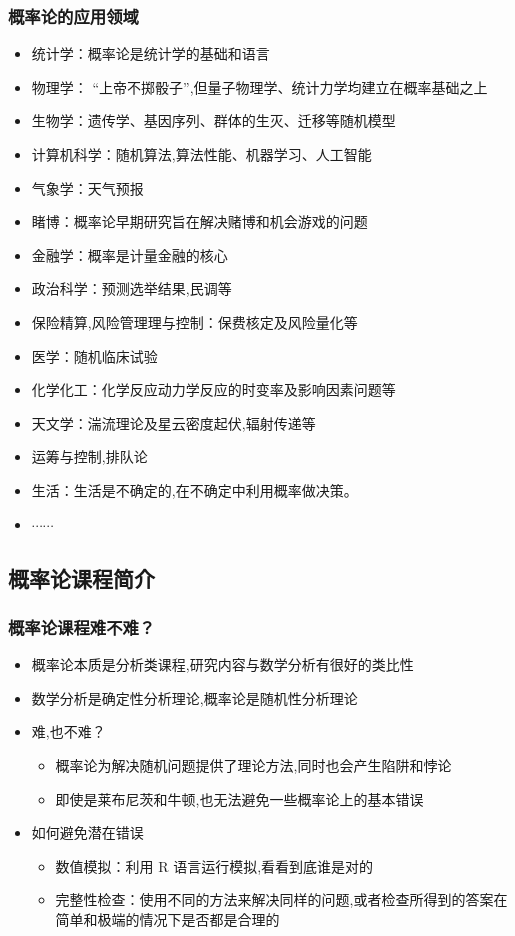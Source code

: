 \documentclass[Prob-All.tex]{subfiles}
\begin{document}
\begin{frame}
	\frametitle{概率论的应用领域}
	\begin{itemize}[<+-|alert@+>]
		\item 统计学：概率论是统计学的基础和语言
		\item 物理学： ``上帝不掷骰子”,但量子物理学、统计力学均建立在概率基础之上
		\item 生物学：遗传学、基因序列、群体的生灭、迁移等随机模型
		\item  计算机科学：随机算法,算法性能、机器学习、人工智能
		\item 气象学：天气预报
		\item 睹博：概率论早期研究旨在解决赌博和机会游戏的问题
		\item 金融学：概率是计量金融的核心
		\item 政治科学：预测选举结果,民调等
		\item 保险精算,风险管理理与控制：保费核定及风险量化等
   		\item 医学：随机临床试验
		\item 化学化工：化学反应动力学反应的时变率及影响因素问题等
		\item 天文学：湍流理论及星云密度起伏,辐射传递等
		\item 运筹与控制,排队论
		\item 生活：生活是不确定的,在不确定中利用概率做决策。
		\item $\cdots\cdots$
	\end{itemize}
\end{frame}
\subsection{概率论课程简介}
\begin{frame}
	\frametitle{概率论课程难不难？}
	\begin{itemize}[<+-|alert@+>]
		\item  概率论本质是分析类课程,研究内容与数学分析有很好的类比性
		\item 数学分析是确定性分析理论,概率论是随机性分析理论
		\item 难,也不难？
		\begin{itemize}[<+-|alert@+>]
			\item  概率论为解决随机问题提供了理论方法,同时也会产生陷阱和悖论
			\item 即使是莱布尼茨和牛顿,也无法避免一些概率论上的基本错误
		\end{itemize}
	\item 如何避免潜在错误
		\begin{itemize}[<+-|alert@+>]
		\item  数值模拟：利用 R 语言运行模拟,看看到底谁是对的
		\item  完整性检查：使用不同的方法来解决同样的问题,或者检查所得到的答案在简单和极端的情况下是否都是合理的
	\end{itemize}
	\end{itemize}
\end{frame}
\end{document}
